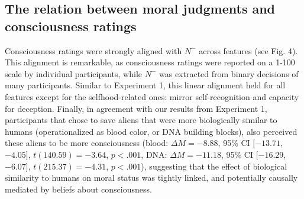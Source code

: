 \documentclass[10pt, letterpaper]{article}
\begin{document}
\hypertarget{the-relation-between-moral-judgments-and-consciousness-ratings-1}{%
\subsection{The relation between moral judgments and consciousness
ratings}\label{the-relation-between-moral-judgments-and-consciousness-ratings-1}}

Consciousness ratings were strongly aligned with \(N^-\) across features
(see Fig. 4). This alignment is remarkable, as consciousness ratings
were reported on a 1-100 scale by individual participants, while \(N^-\)
was extracted from binary decisions of many participants. Similar to
Experiment 1, this linear alignment held for all features except for the
selfhood-related ones: mirror self-recognition and capacity for
deception. Finally, in agreement with our results from Experiment 1,
participants that chose to save aliens that were more biologically
similar to humans (operationalized as blood color, or DNA building
blocks), also perceived these aliens to be more consciousness (blood:
\(\Delta M = -8.88\), 95\% CI \([-13.71\), \(-4.05]\),
\(t(140.59) = -3.64\), \(p < .001\), DNA: \(\Delta M = -11.18\), 95\% CI
\([-16.29\), \(-6.07]\), \(t(215.37) = -4.31\), \(p < .001\)),
suggesting that the effect of biological similarity to humans on moral
status was tightly linked, and potentially causally mediated by beliefs
about consciousness.
\end{document}
